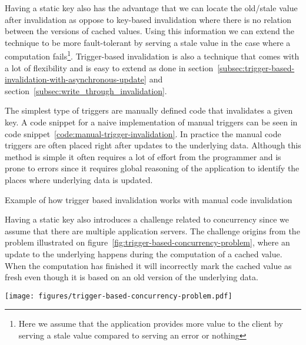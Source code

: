 Having a static key also has the advantage that we can locate the old/stale value after invalidation as oppose to key-based invalidation where there is no relation between the versions of cached values. Using this information we can extend the technique to be more fault-tolerant by serving a stale value in the case where a computation fails\footnote{Here we assume that the application provides more value to the client by serving a stale value compared to serving an error or nothing}. Trigger-based invalidation is also a technique that comes with a lot of flexibility and is easy to extend as done in section~\ref{subsec:trigger-based-invalidation-with-asynchronous-update} and section~\ref{subsec:write_through_invalidation}.

The simplest type of triggers are manually defined code that invalidates a given key. A code snippet for a naive implementation of manual triggers can be seen in code snippet~\ref{code:manual-trigger-invalidation}. In practice the manual code triggers are often placed right after updates to the underlying data. Although this method is simple it often requires a lot of effort from the programmer and is prone to errors since it requires global reasoning of the application to identify the places where underlying data is updated.

\begin{code}{Example of how trigger based invalidation works with manual code invalidation}
  
  \label{code:manual-trigger-invalidation}
\end{code}

Having a static key also introduces a challenge related to concurrency since we assume that there are multiple application servers. The challenge origins from the problem illustrated on figure~\ref{fig:trigger-based-concurrency-problem}, where an update to the underlying happens during the computation of a cached value. When the computation has finished it will incorrectly mark the cached value as fresh even though it is based on an old version of the underlying data.

\begin{figure*}[ht!]
  \centering
  \texttt{[image: figures/trigger-based-concurrency-problem.pdf]}
  \caption{A scenario of the trigger-based invalidation that results in a race condition, where the cached value are being incorrectly marked as valid even though it is storing a stale value.}
  \label{fig:trigger-based-concurrency-problem}
\end{figure*}

